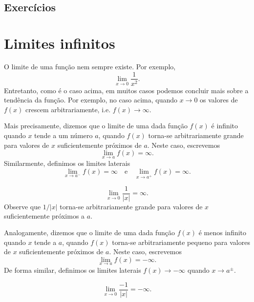 \subsection*{Exercícios}

\emconstrucao


\section{Limites infinitos}\label{cap_lim_sec_lim_inf}

O limite de uma função nem sempre existe. Por exemplo,
\begin{equation}
  \lim_{x\to 0} \frac{1}{x^2}.
\end{equation}
Entretanto, como é o caso acima, em muitos casos podemos concluir mais sobre a tendência da função. Por exemplo, no caso acima, quando $x\to 0$ os valores de $f(x)$ crescem arbitrariamente, i.e. $f(x)\to \infty$.

Mais precisamente, dizemos que o limite de uma dada função $f(x)$ é infinito quando $x$ tende a um número $a$, quando $f(x)$ torna-se arbitrariamente grande para valores de $x$ suficientemente próximos de $a$. Neste caso, escrevemos
\begin{equation}
  \lim_{x\to a} f(x) = \infty.
\end{equation}
Similarmente, definimos os limites laterais
\begin{equation}
  \lim_{x\to a^-} f(x) = \infty\quad\text{e}\quad\lim_{x\to a^+} f(x) = \infty.
\end{equation}

\begin{ex}
  \begin{equation}
    \lim_{x\to 0} \frac{1}{|x|} = \infty.
  \end{equation}
  Observe que $1/|x|$ torna-se arbitrariamente grande para valores de $x$ suficientemente próximos a $a$.
\end{ex}

Analogamente, dizemos que o limite de uma dada função $f(x)$ é menos infinito quando $x$ tende a $a$, quando $f(x)$ torna-se arbitrariamente pequeno para valores de $x$ suficientemente próximos de $a$. Neste caso, escrevemos
\begin{equation}
  \lim_{x\to a} f(x) = -\infty.
\end{equation}
De forma similar, definimos os limites laterais $f(x)\to -\infty$ quando $x\to a^{\pm}$.

\begin{ex}
  \begin{equation}
    \lim_{x\to 0} \frac{-1}{|x|} = -\infty.
  \end{equation}
\end{ex}

